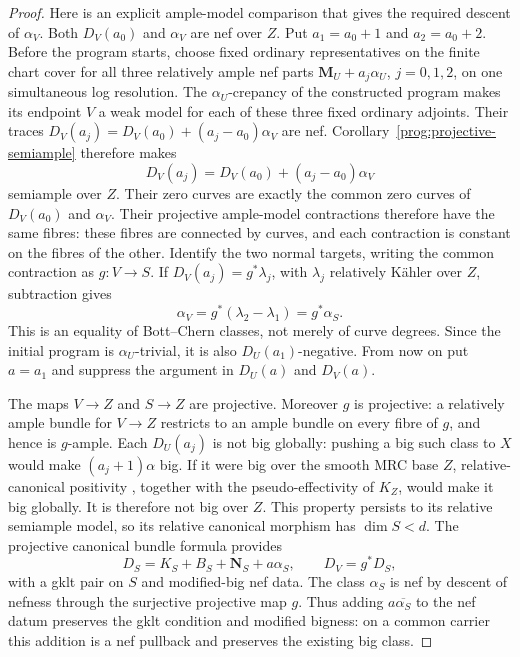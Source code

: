 \begin{proof}
Here is an explicit ample-model comparison that gives the required
descent of $\alpha_V$. Both $D_V(a_0)$ and $\alpha_V$ are nef over
$Z$. Put $a_1=a_0+1$ and $a_2=a_0+2$. Before the program starts,
choose fixed ordinary representatives on the finite chart cover for
all three relatively ample nef parts $\mathbf M_U+a_j\alpha_U$,
$j=0,1,2$, on one simultaneous log resolution. The
$\alpha_U$-crepancy of the constructed program makes its endpoint
$V$ a weak model for each of these three fixed ordinary adjoints.
Their traces $D_V(a_j)=D_V(a_0)+(a_j-a_0)\alpha_V$ are nef.
Corollary~\ref{prog:projective-semiample} therefore makes
\[
 D_V(a_j)=D_V(a_0)+(a_j-a_0)\alpha_V
\]
semiample over $Z$. Their zero curves are exactly the common zero
curves of $D_V(a_0)$ and $\alpha_V$. Their projective ample-model
contractions therefore have the same fibres: these fibres are
connected by curves, and each contraction is constant on the
fibres of the other. Identify the two normal targets, writing the
common contraction as $g:V\to S$. If
$D_V(a_j)=g^*\lambda_j$, with $\lambda_j$ relatively K\"ahler over
$Z$, subtraction gives
\[
 \alpha_V=g^*(\lambda_2-\lambda_1)=g^*\alpha_S.
\]
This is an equality of Bott--Chern classes, not merely of curve
degrees. Since the initial program is $\alpha_U$-trivial, it is
also $D_U(a_1)$-negative. From now on put $a=a_1$ and suppress
the argument in $D_U(a)$ and $D_V(a)$.

The maps $V\to Z$ and $S\to Z$ are projective. Moreover $g$ is
projective: a relatively ample bundle for $V\to Z$ restricts to
an ample bundle on every fibre of $g$, and hence is $g$-ample.
Each $D_U(a_j)$ is not big globally: pushing a big such class to
$X$ would make $(a_j+1)\alpha$ big. If it were big over the smooth
MRC base $Z$, relative-canonical positivity
\cite[Theorem~2.48]{HX}, together with the pseudo-effectivity of
$K_Z$, would make it big globally. It is therefore not big over
$Z$. This property persists to its relative semiample model, so
its relative canonical morphism has $\dim S<d$.
The projective canonical bundle formula
\cite[Theorem~2.53]{HX} provides
\[
 D_S=K_S+B_S+\mathbf N_S+a\alpha_S,
 \qquad D_V=g^*D_S,
\]
with a gklt pair on $S$ and modified-big nef data.
The class $\alpha_S$ is nef by descent of nefness through the
surjective projective map $g$.
Thus adding $a\overline{\alpha_S}$ to the nef datum preserves the
gklt condition and modified bigness: on a common carrier this
addition is a nef pullback and preserves the existing big class.


\end{proof}
